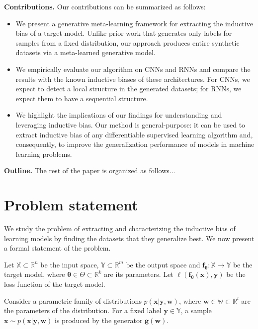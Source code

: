 \documentclass{article}
\begin{document}
\textbf{Contributions.} Our contributions can be summarized as follows:
\begin{itemize}
    \item We present a generative meta-learning framework for extracting the inductive bias of a target model. Unlike prior work that generates only labels for samples from a fixed distribution, our approach produces entire synthetic datasets via a meta-learned generative model.
    \item We empirically evaluate our algorithm on CNNs and RNNs and compare the results with the known inductive biases of these architectures. For CNNs, we expect to detect a local structure in the generated datasets; for RNNs, we expect them to have a sequential structure.
    \item We highlight the implications of our findings for understanding and leveraging inductive bias. Our method is general-purpose: it can be used to extract inductive bias of any differentiable supervised learning algorithm and, consequently, to improve the generalization performance of models in machine learning problems.
\end{itemize}


\textbf{Outline.} The rest of the paper is organized as follows...

\section{Problem statement}\label{sec:prostate}
We study the problem of extracting and characterizing the inductive bias of learning models by finding the datasets that they generalize best. We now present a formal statement of the problem.

Let \(\mathbb{X} \subset \mathbb{R}^n\) be the input space, \(\mathbb{Y} \subset \mathbb{R}^m\) be the output space and \(\mathbf{f}_{\boldsymbol{\theta}}  : \mathbb{X} \to \mathbb{Y}\) be the target model, where $\boldsymbol{\theta} \in \Theta \subset \mathbb{R}^k$ are its parameters. Let \(\ell(\mathbf{f}_{\boldsymbol{\theta}}(\mathbf{x}), \mathbf{y})\) be the loss function of the target model.

Consider a parametric family of distributions \(p(\mathbf{x} | \mathbf{y}, \mathbf{w})\), where $\mathbf{w} \in \mathbb{W} \subset \mathbb{R}^l$ are the parameters of the distribution. For a fixed label \(\mathbf{y} \in \mathbb{Y}\), a sample \(\mathbf{x} \sim p(\mathbf{x} | \mathbf{y}, \mathbf{w})\) is produced by the generator $\mathbf{g}(\mathbf{w})$.
\end{document}
